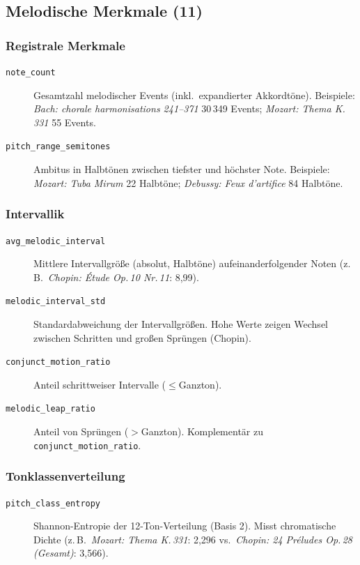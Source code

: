 \documentclass[10pt,a4paper]{article}
\theoremstyle{definition}
\begin{document}
\subsection{Melodische Merkmale (11)}

\subsubsection*{Registrale Merkmale}
\begin{description}
    \item[\texttt{note\_count}] Gesamtzahl melodischer Events (inkl.\ expandierter Akkordtöne). Beispiele: \emph{Bach: chorale harmonisations 241--371} 30\,349 Events; \emph{Mozart: Thema K.\,331} 55 Events.
    
    \item[\texttt{pitch\_range\_semitones}] Ambitus in Halbtönen zwischen tiefster und höchster Note. Beispiele: \emph{Mozart: Tuba Mirum} 22 Halbtöne; \emph{Debussy: Feux d'artifice} 84 Halbtöne.
\end{description}

\subsubsection*{Intervallik}
\begin{description}
    \item[\texttt{avg\_melodic\_interval}] Mittlere Intervallgröße (absolut, Halbtöne) aufeinanderfolgender Noten (z.\,B.\ \emph{Chopin: Étude Op.\,10 Nr.\,11}: 8{,}99).
    
    \item[\texttt{melodic\_interval\_std}] Standardabweichung der Intervallgrößen. Hohe Werte zeigen Wechsel zwischen Schritten und großen Sprüngen (Chopin).
    
    \item[\texttt{conjunct\_motion\_ratio}] Anteil schrittweiser Intervalle ($\leq$Ganzton).
    
    \item[\texttt{melodic\_leap\_ratio}] Anteil von Sprüngen ($>$Ganzton). Komplementär zu \texttt{conjunct\_motion\_ratio}.
\end{description}

\subsubsection*{Tonklassenverteilung}
\begin{description}
    \item[\texttt{pitch\_class\_entropy}] Shannon-Entropie der 12-Ton-Verteilung (Basis 2). Misst chromatische Dichte (z.\,B.\ \emph{Mozart: Thema K.\,331}: 2{,}296 vs.\ \emph{Chopin: 24 Préludes Op.\,28 (Gesamt)}: 3{,}566).
\end{description}
\end{document}
